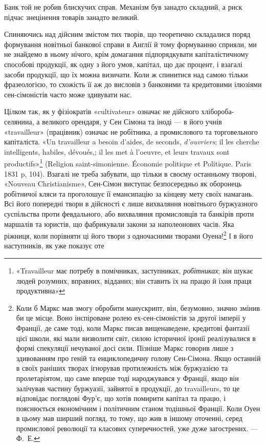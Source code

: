\parcont{}  %
Банк той не робив блискучих справ. Механізм був занадто складний, а риск
підчас знецінення товарів занадто великий.

Спиняючись над дійсним змістом тих творів, що теоретично складалися
поряд формування новітньої банкової справи в Англії й тому формуванню
сприяли, ми не знайдемо в ньому нічого, крім домагання підпорядкувати
капіталістичному способові продукції, як одну з його умов, капітал, що дає процент,
і взагалі засоби продукції, що їх можна визичати. Коли ж спинитися над
самою тільки фразеологією, то схожість її аж до висловів з банковими та кредитовими
ілюзіями сен-сімоністів часто може здивувати нас.

Цілком так, як у фізіократів «cultivateur» означає не дійсного хлібороба-селянииа,
а великого орендаря, у Сен Сімона та іноді — в його учнів «travailleur»
(працівник) означає не робітника, а промислового та торговельного капіталіста.
«Un travailleur a besoin d’aides, de seconds, \emph{d'ouvriers}; il les cherche
intelligents, habiles, dévoués,; il les met à l’oeuvre, et leurs travaux sont productifs»\footnote*{
«Travailleur має потребу в помічниках, заступниках, \emph{робітниках}; він шукає людей розумних,
вправних, відданих; він ставить їх на працю й їхня праця продуктивна» 
}
(Religion saint-simonienne. Économie politique et Politique. Paris 1831 p, 104). Взагалі
не треба забувати, що тільки в своєму останньому творові, «Nouveau Christianisme»,
Сен-Сімон виступає безпосередньо як оборонець робітничої кляси та
проголошує її емансипацію за кінцеву мету своїх намагань. Всі його попередні
твори в дійсності є лише вихваляння новітнього буржуазного суспільства проти
февдального, або вихваляння промисловців та банкірів проти маршалів та юристів,
що фабрикували закони за наполеонових часів. Яка ріжниця, коли порівняти ці його
твори з одночасними творами Оуена!\footnote{
Коли б Маркс мав змогу обробити манускрипт, він, безумовно, значно змінив би це місце.
Воно інспіроване ролею ех-сен-сімоністів за другої імперії у Франції, де саме тоді, коли Маркс
писав вищенаведене, кредитові фантазії цієї школи, які мали визволити світ, силою історичної
іронії реалізувалися в формі спекуляції нечуваної досі сили. Пізніше Маркс говорив лише з
здивованням
про геній та енциклопедичну голову Сен-Сімона. Якщо останній в своїх раніших творах ігнорував
протилежність між буржуазією та пролетаріятом, що саме вперше тоді народжувався у Франції,
якщо він залічував частину буржуазії, зайнятої в продукції, до travailleurs, то це відповідає
поглядові
Фур’є, що хотів помирити капітал та працю, і пояснюється економічним і політичним станом тодішньої
Франції. Коли Оуен в цьому мав ширший погляд, то тому, що жив в іншому оточенні, серед промислової
революції та класових суперечностей, уже дуже загострених. — Ф.~Е.
} І в його наступників, як уже показує оте
